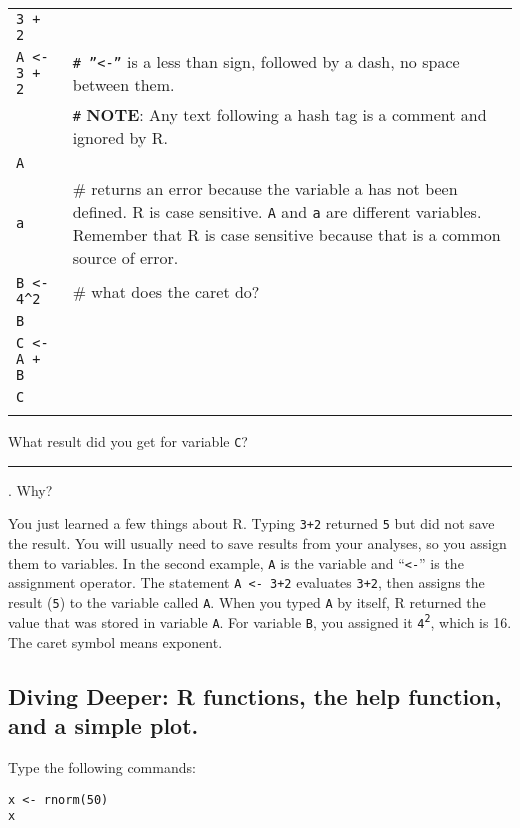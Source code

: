 \documentclass[11pt]{article}
\begin{document}
\begin{tabular}{@{}L{1in}L{4.5in}@{}}
\texttt{3 + 2} & \\

\texttt{A \textless{}- 3 + 2} & \texttt{\# ''\textless{}-''} is a less than sign, followed
by a dash, no space between them. \\
	& 	\texttt{\#} \textbf{NOTE}: Any text following a hash tag is a comment and ignored
by R.\\
 
\texttt{A} & \\

\texttt{a} & \# returns an error because the variable a has not been defined. R is
case sensitive.  \texttt{A} and \texttt{a} are different variables. Remember that R is case sensitive because
that is a common source of error.\\[2ex]

	
\texttt{B \textless{}- 4\^{}2}	&	 \# what does the caret do?\\ 
\texttt{B}	& \\[2ex]
	
\texttt{C \textless{}- A + B} & \\
\texttt{C}	& \\
	&	\\
\end{tabular}


What result did you get for variable \texttt{C}? \rule{5cm}{0.4pt}. Why?

You just learned a few things about R. Typing \texttt{3+2} returned \texttt{5} but did not
save the result. You will usually need to save results from your
analyses, so you assign them to variables. In the second example, \texttt{A} is
the variable and ``\texttt{\textless{}-}'' is the assignment operator. The
statement \texttt{A \textless{}- 3+2} evaluates \texttt{3+2}, then assigns the result (\texttt{5})
to the variable called \texttt{A}. When you typed \texttt{A} by itself, R returned the
value that was stored in variable \texttt{A}. For variable \texttt{B}, you assigned it
\texttt{4\textsuperscript{2}}, which is 16. The caret symbol means exponent.

\subsection*{Diving Deeper: R functions, the help function, and a simple
plot.}

Type the following commands:

\texttt{x \textless{}- rnorm(50)} \\
\texttt{x}
\end{document}
